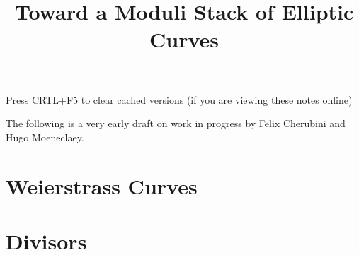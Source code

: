 \documentclass{../util/zariski}
\title{Toward a Moduli Stack of Elliptic Curves}
\begin{document}
\maketitle

\begin{center}
  \color{purple}
  \large{Press CRTL+F5 to clear cached versions}
  \large{(if you are viewing these notes online)}
\end{center}

The following is a very early draft on work in progress by Felix Cherubini and Hugo Moeneclaey.

\tableofcontents

\section{Weierstrass Curves}


\section{Divisors}


\printindex

\printbibliography
\end{document}
